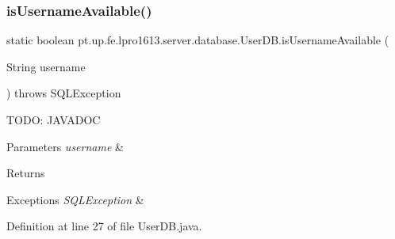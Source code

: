 \subsubsection{\texorpdfstring{is\+Username\+Available()}{isUsernameAvailable()}}
{\footnotesize\ttfamily static boolean pt.\+up.\+fe.\+lpro1613.\+server.\+database.\+User\+D\+B.\+is\+Username\+Available (\begin{DoxyParamCaption}\item[{String}]{username }\end{DoxyParamCaption}) throws S\+Q\+L\+Exception\hspace{0.3cm}{\ttfamily [static]}}

T\+O\+DO\+: J\+A\+V\+A\+D\+OC 
\begin{DoxyParams}{Parameters}
{\em username} & \\
\hline
\end{DoxyParams}
\begin{DoxyReturn}{Returns}

\end{DoxyReturn}

\begin{DoxyExceptions}{Exceptions}
{\em S\+Q\+L\+Exception} & \\
\hline
\end{DoxyExceptions}


Definition at line 27 of file User\+D\+B.\+java.

